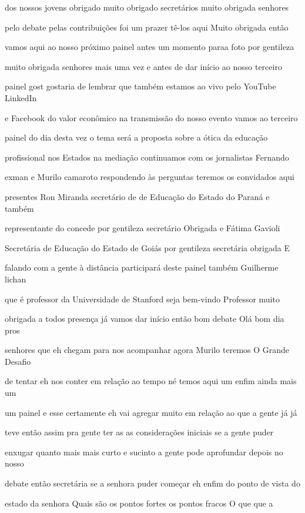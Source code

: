 \documentclass[a4paper,12pt]{article}
\begin{document}
dos nossos jovens obrigado muito obrigado secretários muito obrigada senhores

pelo debate pelas contribuições foi um prazer tê-los aqui Muito obrigada então

vamos aqui ao nosso próximo painel antes um momento paraa foto por gentileza

muito obrigada senhores mais uma vez e antes de dar início ao nosso terceiro

painel gost gostaria de lembrar que também estamos ao vivo pelo YouTube LinkedIn

e Facebook do valor econômico na transmissão do nosso evento vamos ao terceiro

painel do dia desta vez o tema será a proposta sobre a ótica da educação

profissional nos Estados na mediação continuamos com os jornalistas Fernando

exman e Murilo camaroto respondendo às perguntas teremos os convidados aqui

presentes Ron Miranda secretário de de Educação do Estado do Paraná e também

representante do concede por gentileza secretário Obrigada e Fátima Gavioli

Secretária de Educação do Estado de Goiás por gentileza secretária obrigada E

falando com a gente à distância participará deste painel também Guilherme lichan

que é professor da Universidade de Stanford seja bem-vindo Professor muito

obrigada a todos presença já vamos dar início então bom debate Olá bom dia pros

senhores que eh chegam para nos acompanhar agora Murilo teremos O Grande Desafio

de tentar eh nos conter em relação ao tempo né temos aqui um enfim ainda mais um

um painel e esse certamente eh vai agregar muito em relação ao que a gente já já

teve então assim pra gente ter as as considerações iniciais se a gente puder

enxugar quanto mais mais curto e sucinto a gente pode aprofundar depois no nosso

debate então secretária se a senhora puder começar eh enfim do ponto de vista do

estado da senhora Quais são os pontos fortes os pontos fracos O que que a
\end{document}
